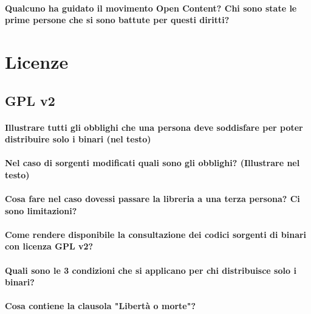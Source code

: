 \documentclass[a4paper]{article}
\begin{document}
	\paragraph{Qualcuno ha guidato il movimento Open Content? Chi sono state le prime persone che si sono battute per questi diritti?}
	
	
	
	
	\section{Licenze}
	
	\subsection{GPL v2}
	
	\paragraph{Illustrare tutti gli obblighi che una persona deve soddisfare per poter distribuire solo i binari 	(nel testo)}
	
	\paragraph{Nel caso di sorgenti modificati quali sono gli obblighi? (Illustrare nel testo)}
	
	\paragraph{Cosa fare nel caso dovessi passare la libreria a una terza persona? Ci sono limitazioni?}
	
	\paragraph{Come rendere disponibile la consultazione dei codici sorgenti di binari con licenza GPL v2?} %
	
	\paragraph{Quali sono le 3 condizioni che si applicano per chi distribuisce solo i binari?}
	
	\paragraph{Cosa contiene la clausola "Libertà o morte"?}
	
\end{document}
